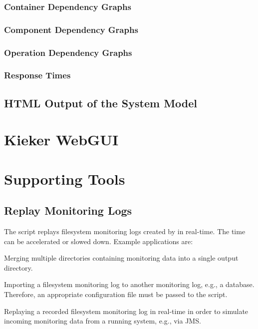 			\subsubsection{Container Dependency Graphs}
			\subsubsection{Component Dependency Graphs}
			\subsubsection{Operation Dependency Graphs}
			\subsubsection{Response Times}
		\subsection{HTML Output of the System Model}	
			
	\section{Kieker WebGUI}
			
	\section{Supporting Tools}
		\subsection{Replay Monitoring Logs}
		
			The script  replays filesystem monitoring logs created by \KiekerMonitoringPart{} in real-time. The time can be accelerated or slowed down. Example applications are:
			\begin{compactitem}
				\item 
				Merging multiple directories containing monitoring data into a single output directory. 
				\item 
				Importing a filesystem monitoring log to another monitoring log, e.g., a database. Therefore, an appropriate \KiekerMonitoringPart{} configuration	file must be passed to the script.
				\item 
				Replaying a recorded filesystem monitoring log in real-time in order to simulate incoming monitoring data from a running system, e.g., via JMS. 
			\end{compactitem}
		
